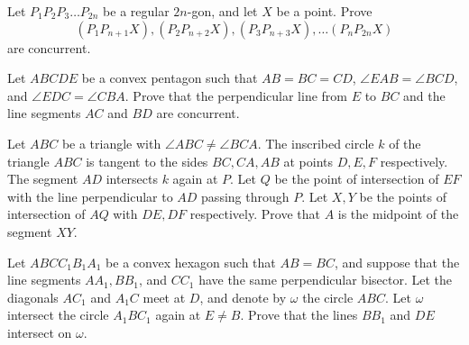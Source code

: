 \documentclass{article}
\begin{document}
\begin{prob}{4}
Let $P_1P_2P_3\dots P_{2n}$ be a regular $2n$-gon, and let $X$ be a point. Prove \[(P_1P_{n+1}X), (P_2P_{n+2}X), (P_3P_{n+3}X),\dots (P_nP_{2n}X)\] are concurrent.
\end{prob}

\begin{prob}[ISL 2017/G1]{6}
Let $ABCDE$ be a convex pentagon such that $AB=BC=CD$, $\angle{EAB}=\angle{BCD}$, and $\angle{EDC}=\angle{CBA}$. Prove that the perpendicular line from $E$ to $BC$ and the line segments $AC$ and $BD$ are concurrent.
\end{prob}

\begin{prob}{6}
Let $ABC$ be a triangle with $\angle  ABC \ne \angle  BCA$. The inscribed circle $k$ of the triangle $ABC$ is tangent to the sides $BC, CA,AB$ at points $D, E , F$ respectively. The segment $AD$ intersects $k$ again at $P$. Let $Q$ be the point of intersection of $EF$ with the line perpendicular to $AD$ passing through $P$. Let $X,Y$ be the points of intersection of $AQ$ with $DE,DF$ respectively. Prove that $A$ is the midpoint of the segment $XY$.
\end{prob}

\begin{prob}[ISL 2017 G5]{9}
Let $ABCC_1B_1A_1$ be a convex hexagon such that $AB=BC$, and suppose that the line segments $AA_1, BB_1$, and $CC_1$ have the same perpendicular bisector. Let the diagonals $AC_1$ and $A_1C$ meet at $D$, and denote by $\omega$ the circle $ABC$. Let $\omega$ intersect the circle $A_1BC_1$ again at $E \neq B$. Prove that the lines $BB_1$ and $DE$ intersect on $\omega$.
\end{prob}
\end{document}
